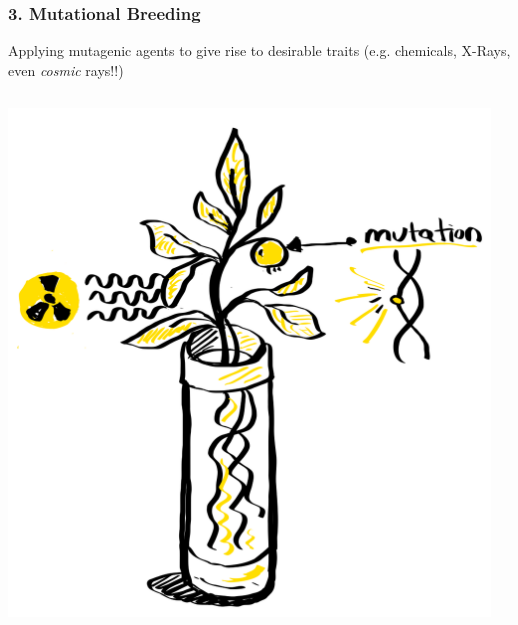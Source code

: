 \documentclass[xcolor=dvipsnames]{beamer}
\begin{document}
\begin{frame}
	\frametitle{3. Mutational Breeding}
	Applying mutagenic agents to give rise to desirable traits (e.g. chemicals, X-Rays, even \textit{cosmic} rays!!)
	
	\begin{columns}
		\begin{column}{0.45\textwidth}
						\includegraphics[keepaspectratio, width  = \textwidth]{img/mutationBreeding}	
		\end{column}
		\begin{column}{0.3\textwidth}


\end{column}
\end{columns}
\end{frame}
\end{document}
